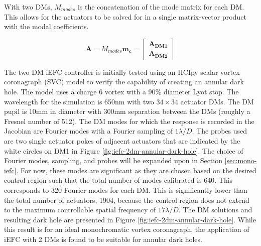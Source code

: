 \documentclass[12pt]{spieman}  %
\begin{document}
\begin{spacing}{2}
With two DMs, $M_{modes}$ is the concatenation of the mode matrix for each DM. This allows for the actuators to be solved for in a single matrix-vector product with the modal coefficients.

\begin{equation}
    \mathbf{A} = M_{modes} \mathbf{m_c} = 
    \begin{bmatrix}
        \mathbf{A_{DM1}} \\
        \mathbf{A_{DM2}}
    \end{bmatrix}
\end{equation}

The two DM iEFC controller is initially tested using an HCIpy\cite{por-hcipy-2018} scalar vortex coronagraph (SVC) model to verify the capability of creating an annular dark hole. The model uses a charge 6 vortex with a 90\% diameter Lyot stop. The wavelength for the simulation is 650nm with two $34\times34$ actuator DMs. The DM pupil is 10mm in diameter with 300mm separation between the DMs (roughly a Fresnel number of 512). The DM modes for which the response is recorded in the Jacobian are Fourier modes with a Fourier sampling of $1\lambda/D$. The probes used are two single actuator pokes of adjacent actuators that are indicated by the white circles on DM1 in Figure \ref{fig:iefc-2dm-annular-dark-hole}. The choice of Fourier modes, sampling, and probes will be expanded upon in Section \ref{sec:mono-iefc}. For now, these modes are significant as they are chosen based on the desired control region such that the total number of modes calibrated is 640. This corresponds to 320 Fourier modes for each DM. This is significantly lower than the total number of actuators, 1904, because the control region does not extend to the maximum controllable spatial frequency of $17\lambda/D$.  The DM solutions and resulting dark hole are presented in Figure \ref{fig:iefc-2dm-annular-dark-hole}. While this result is for an ideal monochromatic vortex coronagraph, the application of iEFC with 2 DMs is found to be suitable for annular dark holes.


\end{spacing}
\end{document}
